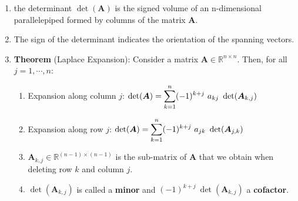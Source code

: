\begin{enumerate}
    \item the determinant $\det(\bm{A})$ is the signed volume of an n-dimensional parallelepiped formed by columns of the matrix $\bm{A}$.
    \hfill \cite{mfml/book/mml/Deisenroth-Faisal-Ong}

    \item The sign of the determinant indicates the orientation of the spanning vectors.
    \hfill \cite{mfml/book/mml/Deisenroth-Faisal-Ong}

    \item \textbf{Theorem} (Laplace Expansion): Consider a matrix $\bm{A} \in \mathbb{R}^{n\times n}$. Then, for all $j = 1, \cdots , n$:
    \hfill \cite{mfml/book/mml/Deisenroth-Faisal-Ong}
    \begin{enumerate}
        \item Expansion along column $j$: 
        $
            \det(\bm{A}) = \displaystyle\sum^n _{k=1} (-1)^{k+j}\  a_{kj}\ \det(\bm{A}_{k,j} )
        $
        \hfill \cite{mfml/book/mml/Deisenroth-Faisal-Ong}

        \item Expansion along row $j$:
        $
            \det(\bm{A}) = \displaystyle\sum^n _{k=1} (-1)^{k+j}\  a_{jk}\ \det(\bm{A}_{j,k} )
        $
        \hfill \cite{mfml/book/mml/Deisenroth-Faisal-Ong}

        \item $\bm{A}_{k,j} \in \mathbb{R}^{(n-1)\times(n-1)}$ is the sub-matrix of $\bm{A}$ that we obtain when deleting row $k$ and column $j$.
        \hfill \cite{mfml/book/mml/Deisenroth-Faisal-Ong}

        \item $\det(\bm{A}_{k,j} )$ is called a \textbf{minor} and $(-1)^{k+j}\ \det(\bm{A}_{k,j} )$ a \textbf{cofactor}.
        \hfill \cite{mfml/book/mml/Deisenroth-Faisal-Ong}
    \end{enumerate}
\end{enumerate}










